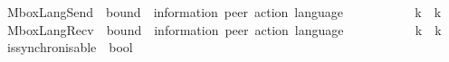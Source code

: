 \begin{isabellebody}
\isanewline
{}\isamarkupfalse%
\ MboxLangSend\ {\isacharcolon}{\kern0pt}{\isacharcolon}{\kern0pt}\ {\isachardoublequoteopen}bound\ {\isasymRightarrow}\ {\isacharparenleft}{\kern0pt}{\isacharprime}{\kern0pt}information{\isacharcomma}{\kern0pt}\ {\isacharprime}{\kern0pt}peer{\isacharparenright}{\kern0pt}\ action\ language{\isachardoublequoteclose}\ \ {\isacharparenleft}{\kern0pt}{\isachardoublequoteopen}{\isasymL}\isactrlsub {\isacharbang}{\kern0pt}\isactrlbsub {\isacharunderscore}{\kern0pt}\isactrlesub {\isachardoublequoteclose}\ {\isacharbrackleft}{\kern0pt}{}{}{}{\isacharbrackright}{\kern0pt}\ {}{}{}{\isacharparenright}{\kern0pt}\isanewline
\ \ \isanewline
\ \ \ \ {\isachardoublequoteopen}{\isasymL}\isactrlsub {\isacharbang}{\kern0pt}\isactrlbsub k\isactrlesub \ {\isasymequiv}\ {\isacharparenleft}{\kern0pt}{\isasymL}\isactrlbsub k\isactrlesub {\isacharparenright}{\kern0pt}{\isasymdownharpoonright}\isactrlsub {\isacharbang}{\kern0pt}{\isachardoublequoteclose}\isanewline
\isanewline
{}\isamarkupfalse%
\ MboxLangRecv\ {\isacharcolon}{\kern0pt}{\isacharcolon}{\kern0pt}\ {\isachardoublequoteopen}bound\ {\isasymRightarrow}\ {\isacharparenleft}{\kern0pt}{\isacharprime}{\kern0pt}information{\isacharcomma}{\kern0pt}\ {\isacharprime}{\kern0pt}peer{\isacharparenright}{\kern0pt}\ action\ language{\isachardoublequoteclose}\ \ {\isacharparenleft}{\kern0pt}{\isachardoublequoteopen}{\isasymL}\isactrlsub {\isacharquery}{\kern0pt}\isactrlbsub {\isacharunderscore}{\kern0pt}\isactrlesub {\isachardoublequoteclose}\ {\isacharbrackleft}{\kern0pt}{}{}{}{\isacharbrackright}{\kern0pt}\ {}{}{}{\isacharparenright}{\kern0pt}\isanewline
\ \ \isanewline
\ \ \ \ {\isachardoublequoteopen}{\isasymL}\isactrlsub {\isacharquery}{\kern0pt}\isactrlbsub k\isactrlesub \ {\isasymequiv}\ {\isacharparenleft}{\kern0pt}{\isasymL}\isactrlbsub k\isactrlesub {\isacharparenright}{\kern0pt}{\isasymdownharpoonright}\isactrlsub {\isacharquery}{\kern0pt}{\isachardoublequoteclose}%
\isadelimdocument
%
\endisadelimdocument
%
\isatagdocument
%
\isamarkuptrue%
%
\endisatagdocument
{\isafolddocument}%
%
\isadelimdocument
%
\endisadelimdocument
{}\isamarkupfalse%
\ is{\isacharunderscore}{\kern0pt}synchronisable\ {\isacharcolon}{\kern0pt}{\isacharcolon}{\kern0pt}\ {\isachardoublequoteopen}bool{\isachardoublequoteclose}\ \isanewline

\end{isabellebody}
